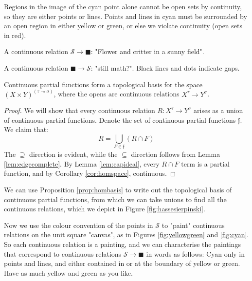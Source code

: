 \begin{marginfigure}
\centering
{}
\caption{Regions in the image of the cyan point alone cannot be open sets by continuity, so they are either points or lines. Points and lines in cyan must be surrounded by an open region in either yellow or green, or else we violate continuity (open sets in red).}
\label{fig:cyan}
\end{marginfigure}

\begin{marginfigure}
\centering
{}
\caption{A continuous relation $\mathcal{S} \rightarrow \blacksquare$: "Flower and critter in a sunny field".}
\label{fig:flower}
\end{marginfigure}

\begin{marginfigure}
\centering
{}
\caption{A continuous relation $\blacksquare \rightarrow \mathcal{S}$: "still math?". Black lines and dots indicate gaps.}
\label{fig:shitpost}
\end{marginfigure}

\begin{proposition}\label{prop:hombasis}
Continuous partial functions form a topological basis for the space $(X \times Y)^{(\tau \multimap \sigma)}$, where the opens are continuous relations $X^\tau \rightarrow Y^\sigma$.
\begin{proof}
We will show that every continuous relation $R: X^\tau \rightarrow Y^\sigma$ arises as a union of continuous partial functions. Denote the set of continuous partial functions $\mathfrak{f}$. We claim that:
\[ R = \bigcup\limits_{F \in \mathfrak{f}} (R \cap F) \]
The $\supseteq$ direction is evident, while the $\subseteq$ direction follows from Lemma \ref{lem:edgecomplete}.
By Lemma \ref{lem:capideal}, every $R \cap F$ term is a partial function, and by Corollary \ref{cor:homspace}, continuous.
\end{proof}
\end{proposition}

 We can use Proposition \ref{prop:hombasis} to write out the topological basis of continuous partial functions, from which we can take unions to find all the continuous relations, which we depict in Figure \ref{fig:hassesierpinski}.

Now we use the colour convention of the points in $\mathcal{S}$ to "paint" continuous relations on the unit square "canvas", as in Figures \ref{fig:yellowgreen} and \ref{fig:cyan}. So each continuous relation is a painting, and we can characterise the paintings that correspond to continuous relations $\mathcal{S} \rightarrow \blacksquare$ in words as follows: Cyan only in points and lines, and either contained in or at the boundary of yellow or green. Have as much yellow and green as you like.

